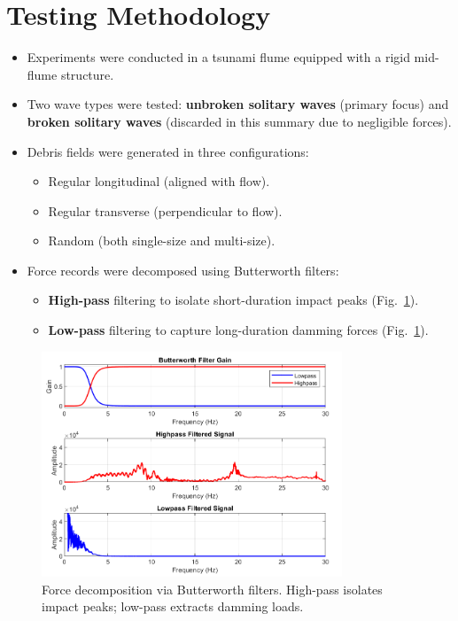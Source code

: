 \documentclass{article}
\begin{document}
\section{Testing Methodology}
\begin{itemize}
    \item Experiments were conducted in a tsunami flume equipped with a rigid mid-flume structure.
    \item Two wave types were tested: \textbf{unbroken solitary waves} (primary focus) and \textbf{broken solitary waves} (discarded in this summary due to negligible forces).
    \item Debris fields were generated in three configurations:
    \begin{itemize}
        \item Regular longitudinal (aligned with flow).
        \item Regular transverse (perpendicular to flow).
        \item Random (both single-size and multi-size).
    \end{itemize}
    \item Force records were decomposed using Butterworth filters:
    \begin{itemize}
        \item \textbf{High-pass} filtering to isolate short-duration impact peaks (Fig.~\ref{fig:high_low_pass}).
        \item \textbf{Low-pass} filtering to capture long-duration damming forces (Fig.~\ref{fig:high_low_pass}).
    \end{itemize}
\end{itemize}

\begin{figure}[htbp]
    \centering
    \includegraphics[width=0.8\textwidth]{high_low_pass.png}
    \caption{Force decomposition via Butterworth filters. High-pass isolates impact peaks; low-pass extracts damming loads.}
    \label{fig:high_low_pass}
\end{figure}
\end{document}
